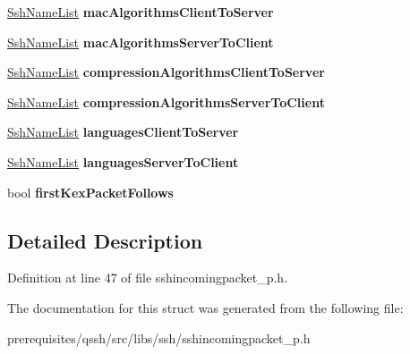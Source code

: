 \begin{DoxyCompactItemize}
\item 
\mbox{\label{struct_q_ssh_1_1_internal_1_1_ssh_key_exchange_init_aa1ab09d79ec13fa4c61b6165371b0796}} 
\mbox{\hyperlink{struct_q_ssh_1_1_internal_1_1_ssh_name_list}{Ssh\+Name\+List}} {\bfseries mac\+Algorithms\+Client\+To\+Server}
\item 
\mbox{\label{struct_q_ssh_1_1_internal_1_1_ssh_key_exchange_init_a421b2be0569635fa6b14c54f02b79293}} 
\mbox{\hyperlink{struct_q_ssh_1_1_internal_1_1_ssh_name_list}{Ssh\+Name\+List}} {\bfseries mac\+Algorithms\+Server\+To\+Client}
\item 
\mbox{\label{struct_q_ssh_1_1_internal_1_1_ssh_key_exchange_init_a94e4fdc4dc7a84b6908ad03ccb82d625}} 
\mbox{\hyperlink{struct_q_ssh_1_1_internal_1_1_ssh_name_list}{Ssh\+Name\+List}} {\bfseries compression\+Algorithms\+Client\+To\+Server}
\item 
\mbox{\label{struct_q_ssh_1_1_internal_1_1_ssh_key_exchange_init_a5ae2875546a6d995a0905987f004c224}} 
\mbox{\hyperlink{struct_q_ssh_1_1_internal_1_1_ssh_name_list}{Ssh\+Name\+List}} {\bfseries compression\+Algorithms\+Server\+To\+Client}
\item 
\mbox{\label{struct_q_ssh_1_1_internal_1_1_ssh_key_exchange_init_a6430d3da8445af954e0e2b67da0963c4}} 
\mbox{\hyperlink{struct_q_ssh_1_1_internal_1_1_ssh_name_list}{Ssh\+Name\+List}} {\bfseries languages\+Client\+To\+Server}
\item 
\mbox{\label{struct_q_ssh_1_1_internal_1_1_ssh_key_exchange_init_af81b6913c80ecf9d869f2e3b28c74aa1}} 
\mbox{\hyperlink{struct_q_ssh_1_1_internal_1_1_ssh_name_list}{Ssh\+Name\+List}} {\bfseries languages\+Server\+To\+Client}
\item 
\mbox{\label{struct_q_ssh_1_1_internal_1_1_ssh_key_exchange_init_abb3f6ce990c42a5fee387a21649d5b03}} 
bool {\bfseries first\+Kex\+Packet\+Follows}
\end{DoxyCompactItemize}


\subsection{Detailed Description}


Definition at line 47 of file sshincomingpacket\+\_\+p.\+h.



The documentation for this struct was generated from the following file\+:\begin{DoxyCompactItemize}
\item 
prerequisites/qssh/src/libs/ssh/sshincomingpacket\+\_\+p.\+h\end{DoxyCompactItemize}
